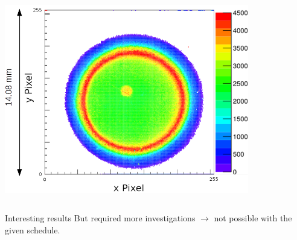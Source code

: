 \begin{frame}[t]
\begin{columns}
\begin{column}{0.45\textwidth}
      \includegraphics[width=0.8\textwidth]{04_Test/fig/fig000_IRMA_damage5.png}
    \end{column}
  \end{columns}
  \begin{alertblock}{Interesting results}
    But required more investigations $\rightarrow$ not possible with the given schedule.
  \end{alertblock}
\end{frame}

